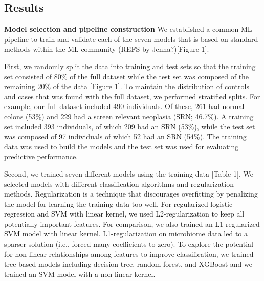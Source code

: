 \documentclass[11pt,]{article}
\begin{document}
\subsection{Results}\label{results}

\textbf{Model selection and pipeline construction} We established a
common ML pipeline to train and validate each of the seven models that
is based on standard methods within the ML community (REFS by
Jenna?){[}Figure 1{]}.

First, we randomly split the data into training and test sets so that
the training set consisted of 80\% of the full dataset while the test
set was composed of the remaining 20\% of the data {[}Figure 1{]}. To
maintain the distribution of controls and cases that was found with the
full dataset, we performed stratified splits. For example, our full
dataset included 490 individuals. Of these, 261 had normal colons (53\%)
and 229 had a screen relevant neoplasia (SRN; 46.7\%). A training set
included 393 individuals, of which 209 had an SRN (53\%), while the test
set was composed of 97 individuals of which 52 had an SRN (54\%). The
training data was used to build the models and the test set was used for
evaluating predictive performance.

Second, we trained seven different models using the training data
{[}Table 1{]}. We selected models with different classification
algorithms and regularization methods. Regularization is a technique
that discourages overfitting by penalizing the model for learning the
training data too well. For regularized logistic regression and SVM with
linear kernel, we used L2-regularization to keep all potentially
important features. For comparison, we also trained an L1-regularized
SVM model with linear kernel. L1-regularization on microbiome data led
to a sparser solution (i.e., forced many coefficients to zero). To
explore the potential for non-linear relationships among features to
improve classification, we trained tree-based models including decision
tree, random forest, and XGBoost and we trained an SVM model with a
non-linear kernel.
\end{document}
